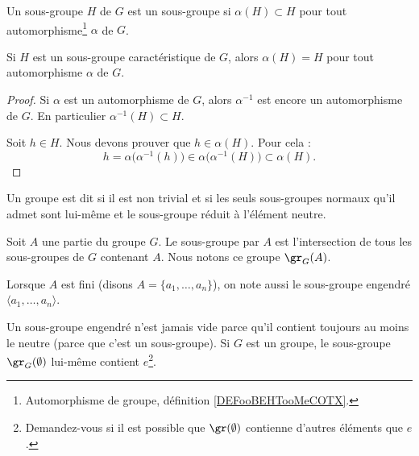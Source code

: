 \begin{definition}      \label{DEFooUXXTooCCLmQe}
	Un sous-groupe \( H\) de \( G\) est un sous-groupe  si \( \alpha(H)\subset H\) pour tout automorphisme\footnote{Automorphisme de groupe, définition \ref{DEFooBEHTooMeCOTX}.} \( \alpha\) de \( G\).
\end{definition}

\begin{lemma}
	Si \( H\) est un sous-groupe caractéristique de \( G\), alors \( \alpha(H)=H\) pour tout automorphisme \( \alpha\) de \( G\).
\end{lemma}

\begin{proof}
	Si \( \alpha\) est un automorphisme de \( G\), alors \( \alpha^{-1}\) est encore un automorphisme de \( G\). En particulier \( \alpha^{-1}(H)\subset H\).

	Soit \( h\in H\). Nous devons prouver que \( h\in \alpha(H)\). Pour cela :
	\begin{equation}
		h=\alpha\big( \alpha^{-1}(h) \big)\in \alpha\big( \alpha^{-1}(H) \big)\subset\alpha(H).
	\end{equation}
\end{proof}

\begin{definition}                 \label{DefGroupeSimple}
	Un groupe est dit  si il est non trivial et si les seuls sous-groupes normaux qu'il admet sont lui-même et le sous-groupe réduit à l'élément neutre.
\end{definition}

\begin{definition}          \label{DefooRDRXooEhVxxu}
	Soit \( A\) une partie du groupe \( G\). Le sous-groupe  par \( A\) est l'intersection de tous les sous-groupes de \( G\) contenant \( A\). Nous notons ce groupe \( \gr_G(A)\).

	Lorsque \( A \) est fini (disons \( A = \{a_1, \dots, a_n\} \)), on note aussi le sous-groupe engendré \( \langle a_1, \dots, a_n \rangle \).
\end{definition}

\begin{normaltext}
	Un sous-groupe engendré n'est jamais vide parce qu'il contient toujours au moins le neutre (parce que c'est un sous-groupe). Si \( G\) est un groupe, le sous-groupe \( \gr_G(\emptyset)\) lui-même contient \( e\)\footnote{Demandez-vous si il est possible que \( \gr(\emptyset)\) contienne d'autres éléments que \( e\).}.
\end{normaltext}

